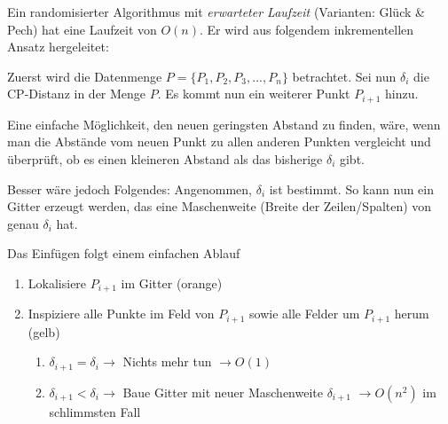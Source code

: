 \documentclass{scrartcl}%
\begin{document}
    Ein randomisierter Algorithmus mit \textit{erwarteter Laufzeit}
    (Varianten: Glück & Pech) hat eine Laufzeit von $O(n)$.
    Er wird aus folgendem inkrementellen Ansatz hergeleitet:

    Zuerst wird die Datenmenge $P = \{ P_1, P_2, P_3, ..., P_n \}$ betrachtet.
    Sei nun $\delta_i$ die CP-Distanz in der Menge $P$.
    Es kommt nun ein weiterer Punkt $P_{i+1}$ hinzu.

    Eine einfache Möglichkeit, den neuen geringsten Abstand zu finden, wäre,
    wenn man die Abstände vom neuen Punkt zu allen anderen Punkten vergleicht und überprüft,
    ob es einen kleineren Abstand als das bisherige $\delta_i$ gibt.

    Besser wäre jedoch Folgendes: Angenommen, $\delta_i$ ist bestimmt.
    So kann nun ein Gitter erzeugt werden, das eine Maschenweite
    (Breite der Zeilen/Spalten) von genau $\delta_i$ hat.

    \begin{figure}[h]
        \centering
        \begin{table}[H]
            \centering
        \end{table}
    \end{figure}

    \newpage
    Das Einfügen folgt einem einfachen Ablauf

    \begin{enumerate}
        \item Lokalisiere $P_{i+1}$ im Gitter (orange)
        \item Inspiziere alle Punkte im Feld von $P_{i+1}$ sowie alle Felder um $P_{i+1}$ herum (gelb)
        \begin{enumerate}
            \item $\delta_{i+1} = \delta_i \rightarrow$ Nichts mehr tun $\rightarrow O(1)$
            \item $\delta_{i+1} < \delta_i \rightarrow$ Baue Gitter mit neuer Maschenweite
            $\delta_{i+1}$ $\rightarrow O(n^2)$ im schlimmsten Fall
        \end{enumerate}
    \end{enumerate}
\end{document}
